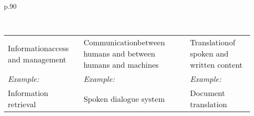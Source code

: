 {\begin{tabular}{p{.90\linewidth}}
   \vspace{.15cm}\centerline{{\textcolor{white}{\Large  What are the major topics?}}}
  \center
  \begin{tabular}{p{.30\linewidth} p{.30\linewidth}p{.30\linewidth}}
  \rowcolor{yellow} \vspace{.001cm} {\large Information\newline access and
    management} & \vspace{.001cm} {\large Communication\newline  between
    humans and between humans and machines} & \vspace{.001cm}  {\large
    Translation\newline of spoken and written content} \\[4mm]
  \rowcolor{yellow} \emph{Example:} & \emph{Example:} & \emph{Example:} \\
  \rowcolor{yellow} Information retrieval & Spoken dialogue system & Document translation\\[2mm]
  \end{tabular}
  \vspace*{2mm} \\

  \end{tabular}
}

